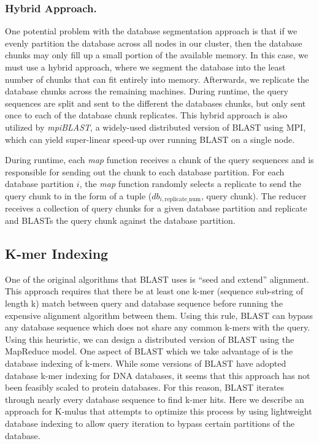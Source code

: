 \subsubsection{Hybrid Approach.}
One potential problem with the database segmentation approach is that if we evenly partition the database across all nodes in our cluster, then the database chunks may only fill up a small portion of the available memory.
In this case, we must use a hybrid approach, where we segment the database into the least number of chunks that can fit entirely into memory.
Afterwards, we replicate the database chunks across the remaining machines.
During runtime, the query sequences are split and sent to the different the databases chunks, but only sent once to each of the database chunk replicates.
This hybrid approach is also utilized by \emph{mpiBLAST}\cite{darling2003design}, a widely-used distributed version of BLAST using MPI, which can yield super-linear speed-up over running BLAST on a single node.

During runtime, each \emph{map} function receives a chunk of the query sequences and is responsible for sending out the chunk to each database partition.
For each database partition $i$, the \emph{map} function randomly selects a replicate to send the query chunk to in the form of a tuple ($db_{i,\text{replicate\_num}}$, query chunk).
The reducer receives a collection of query chunks for a given database partition and replicate and BLASTs the query chunk against the database partition.

\subsection{K-mer Indexing}
One of the original algorithms that BLAST uses is ``seed and extend'' alignment. This approach requires that there be at least one k-mer (sequence sub-string of length k) match between query and database sequence before running the expensive alignment algorithm between them\cite{altschul1990basic}. Using this rule, BLAST can bypass any database sequence which does not share any common k-mers with the query. Using this heuristic, we can design a distributed version of BLAST using the MapReduce model. One aspect of BLAST which we take advantage of is the database indexing of k-mers. While some versions of BLAST have adopted database k-mer indexing for DNA databases, it seems that this approach has not been feasibly scaled to protein databases\cite{morgulis2008database}. For this reason, BLAST iterates through nearly every database sequence to find k-mer hits. Here we describe an approach for K-mulus that attempts to optimize this process by using lightweight database indexing to allow query iteration to bypass certain partitions of the database.

